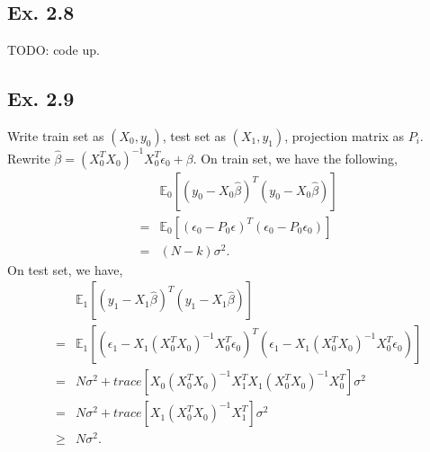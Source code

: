 \subsection*{Ex. 2.8}
TODO: code up.

\subsection*{Ex. 2.9}
Write train set as $(X_0, y_0)$, test set as $(X_1, y_1)$, projection matrix as $P_i$.
Rewrite $\hat{\beta} = (X_0^T X_0)^{-1}X_0^{T}\epsilon_0 + \beta.$ On train set, we have the following,
\begin{eqnarray*}
	&&\mathbb{E}_{0}\left[(y_0 - X_0\hat{\beta})^T(y_0 - X_0\hat{\beta})\right]\\
	&=&\mathbb{E}_{0}\left[(\epsilon_0 - P_0\epsilon)^T(\epsilon_0 - P_0\epsilon_0)\right]\\
	&=&(N - k)\sigma^2.
\end{eqnarray*}
On test set, we have,
\begin{eqnarray*}
	&&\mathbb{E}_{1}\left[(y_1 - X_1\hat{\beta})^T(y_1 - X_1\hat{\beta})\right]\\
	&=&\mathbb{E}_{1}\left[(\epsilon_1 - X_1(X_0^TX_0)^{-1}X_0^T\epsilon_0)^T(\epsilon_1 - X_1(X_0^TX_0)^{-1}X_0^T\epsilon_0)\right]\\
	&=&N\sigma^2 + trace\left[X_0(X_0^TX_0)^{-1}X_1^TX_1(X_0^TX_0)^{-1}X_0^T\right]\sigma^2\\
	&=&N\sigma^2 + trace\left[X_1(X_0^TX_0)^{-1}X_1^T\right]\sigma^2\\
	&\geq& N\sigma^2.
\end{eqnarray*}